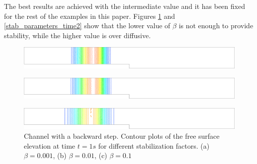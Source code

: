 \documentclass[a4paper,12pt]{elsarticle}
\begin{document}
The best results are achieved with the intermediate value and it has been fixed for the rest of the examples in this paper.
Figures \ref{stab_parameters_time1} and \ref{stab_parameters_time2} show that the lower value of $\beta$ is not enough to provide stability, while the higher value is over diffusive.

\begin{figure}[H]
\begin{subfigure}{.05\textwidth}
    \caption{}
\end{subfigure}
\begin{minipage}[c]{.94\textwidth}
    \includegraphics[width=\textwidth]{img/step/stab_0.001_time_1.pdf}        
\end{minipage}
\par\medskip
\begin{subfigure}{.05\textwidth}
    \caption{}
\end{subfigure}
\begin{minipage}[c]{.94\textwidth}
    \includegraphics[width=\textwidth]{img/step/stab_0.01_time_1.pdf}        
\end{minipage}
\par\medskip
\begin{subfigure}{.05\textwidth}
    \caption{}
\end{subfigure}
\begin{minipage}[c]{.94\textwidth}
    \includegraphics[width=\textwidth]{img/step/stab_0.1_time_1.pdf}        
\end{minipage}
\caption{Channel with a backward step. Contour plots of the free surface elevation at time $t=1s$ for different stabilization factors. (a) $\beta=0.001$, (b) $\beta=0.01$, (c) $\beta=0.1$}
\label{stab_parameters_time1}
\end{figure}
\end{document}
